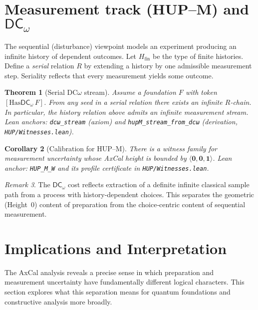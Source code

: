 \documentclass[11pt]{article}
\newcommand{\DCw}{\mathsf{DC}_{\omega}}
\newcommand{\hzero}{\mathbf{0}}
\newcommand{\hone}{\mathbf{1}}
\newcommand{\DCwonly}{\langle \hzero,\hzero,\hone\rangle}
\newcommand{\lean}[1]{\texttt{#1}}
\newcommand{\leanok}{\text{\tiny [✓ Lean Verified]}}
\theoremstyle{plain}
\newtheorem{theorem}{Theorem}[section]
\newtheorem{corollary}[theorem]{Corollary}
\theoremstyle{definition}
\theoremstyle{remark}
\newtheorem{remark}[theorem]{Remark}
\begin{document}
\section{Measurement track (HUP--M) and $\DCw$}
\label{sec:measurement-DC}

The sequential (disturbance) viewpoint models an experiment producing an infinite history of dependent outcomes.
Let $H_{\mathrm{fin}}$ be the type of finite histories. Define a \emph{serial} relation $R$ by extending a history by one admissible measurement step. Seriality reflects that every measurement yields some outcome.

\begin{theorem}[Serial DC$\omega$ stream]\leanok
\label{thm:dcomega}
Assume a foundation $F$ with token $[\mathrm{Has}\DCw\,F]$.
From any seed in a serial relation there exists an infinite $R$-chain. In particular, the history relation above admits an infinite measurement stream.
\emph{Lean anchors:} \lean{dcω\_stream} (axiom) and \lean{hupM\_stream\_from\_dcω} (derivation, \texttt{HUP/Witnesses.lean}).
\end{theorem}

\begin{corollary}[Calibration for HUP--M]\leanok
\label{cor:HUPM}
There is a witness family for measurement uncertainty whose AxCal height is bounded by $\DCwonly$.
\emph{Lean anchor:} \lean{HUP\_M\_W} and its profile certificate in \texttt{HUP/Witnesses.lean}.
\end{corollary}

\begin{remark}
The $\DCw$ cost reflects extraction of a definite infinite classical sample path from a process with history-dependent choices.
This separates the geometric (Height~0) content of preparation from the choice‑centric content of sequential measurement.
\end{remark}

\section{Implications and Interpretation}
\label{sec:implications}

The AxCal analysis reveals a precise sense in which preparation and measurement uncertainty have fundamentally different logical characters. This section explores what this separation means for quantum foundations and constructive analysis more broadly.
\end{document}
